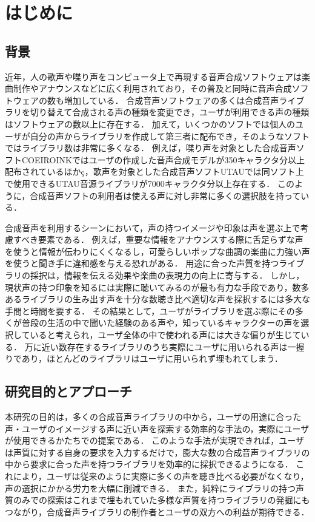 \chapter{はじめに}
\thispagestyle{myheadings}

\section{背景}
近年，人の歌声や喋り声をコンピュータ上で再現する音声合成ソフトウェアは楽曲制作やアナウンスなどに広く利用されており，その普及と同時に音声合成ソフトウェアの数も増加している．
合成音声ソフトウェアの多くは合成音声ライブラリを切り替えて合成される声の種類を変更でき，ユーザが利用できる声の種類はソフトウェアの数以上に存在する．
加えて，いくつかのソフトでは個人のユーザが自分の声からライブラリを作成して第三者に配布でき，そのようなソフトではライブラリ数は非常に多くなる．
例えば，喋り声を対象とした合成音声ソフトCOEIROINKではユーザの作成した音声合成モデルが350キャラクタ分以上配布されているほか\cite{mycoeiroink}ç，歌声を対象とした合成音声ソフトUTAUでは同ソフト上で使用できるUTAU音源ライブラリが7000キャラクタ分以上存在する\cite{vdbutau}．
このように，合成音声ソフトの利用者は使える声に対し非常に多くの選択肢を持っている．

合成音声を利用するシーンにおいて，声の持つイメージや印象は声を選ぶ上で考慮すべき要素である．
例えば，重要な情報をアナウンスする際に舌足らずな声を使うと情報が伝わりにくくなるし，可愛らしいポップな曲調の楽曲に力強い声を使うと聞き手に違和感を与える恐れがある．
用途に合った声質を持つライブラリの採択は，情報を伝える効果や楽曲の表現力の向上に寄与する．
しかし，現状声の持つ印象を知るには実際に聴いてみるのが最も有力な手段であり，数多あるライブラリの生み出す声を十分な数聴き比べ適切な声を採択するには多大な手間と時間を要する．
その結果として，ユーザがライブラリを選ぶ際にその多くが普段の生活の中で聞いた経験のある声や，知っているキャラクターの声を選択していると考えられ，ユーザ全体の中で使われる声には大きな偏りが生じている．
万に近い数存在するライブラリのうち実際にユーザに用いられる声は一握りであり，ほとんどのライブラリはユーザに用いられず埋もれてしまう．

\section{研究目的とアプローチ}
本研究の目的は，多くの合成音声ライブラリの中から，ユーザの用途に合った声・ユーザのイメージする声に近い声を探索する効率的な手法の，実際にユーザが使用できるかたちでの提案である．
このような手法が実現できれば，ユーザは声質に対する自身の要求を入力するだけで，膨大な数の合成音声ライブラリの中から要求に合った声を持つライブラリを効率的に採択できるようになる．
これにより，ユーザは従来のように実際に多くの声を聴き比べる必要がなくなり，声の選択にかかる労力を大幅に削減できる．
また，純粋にライブラリの持つ声質のみでの探索はこれまで埋もれていた多様な声質を持つライブラリの発掘にもつながり，合成音声ライブラリの制作者とユーザの双方への利益が期待できる．

